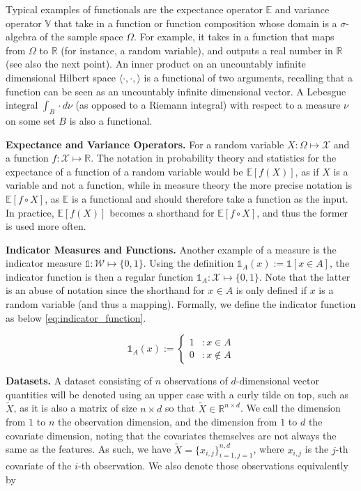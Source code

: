 \documentclass[twoside]{article} \usepackage{aistats2017}
\theoremstyle{definition}
\newcommand{\rv}[1]{{#1}}
\newcommand{\ds}[1]{\tilde{#1}}
\begin{document}
	Typical examples of functionals are the expectance operator $\mathbb{E}$ and variance operator $\mathbb{V}$ that take in a function or function composition whose domain is a $\sigma$-algebra of the sample space $\Omega$. For example, it takes in a function that maps from $\Omega$ to $\mathbb{R}$ (for instance, a random variable), and outputs a real number in $\mathbb{R}$ (see also the next point). An inner product on an uncountably infinite dimensional Hilbert space $\langle \cdot, \cdot, \rangle$ is a functional of two arguments, recalling that a function can be seen as an uncountably infinite dimensional vector. A Lebesgue integral $\int_{B} \cdot d\nu$ (as opposed to a Riemann integral) with respect to a measure $\nu$ on some set $B$ is also a functional.
	
	\textbf{Expectance and Variance Operators.} For a random variable $\rv{X} : \Omega \mapsto \mathcal{X}$ and a function $f : \mathcal{X} \mapsto \mathbb{R}$. The notation in probability theory and statistics for the expectance of a function of a random variable would be $\mathbb{E}[f(\rv{X})]$, as if $\rv{X}$ is a variable and not a function, while in measure theory the more precise notation is $\mathbb{E}[f \circ \rv{X}]$, as $\mathbb{E}$ is a functional and should therefore take a function as the input. In practice, $\mathbb{E}[f(\rv{X})]$ becomes a shorthand for $\mathbb{E}[f \circ \rv{X}]$, and thus the former is used more often.
	
	\textbf{Indicator Measures and Functions.} Another example of a measure is the indicator measure $\mathbb{1} : \mathcal{W} \mapsto \{0, 1\}$. Using the definition $\mathbb{1}_{A}(x) := \mathbb{1}[x \in A]$, the indicator function is then a regular function $\mathbb{1}_{A} : \mathcal{X} \mapsto \{0, 1\}$. Note that the latter is an abuse of notation since the shorthand for $x \in A$ is only defined if $x$ is a random variable (and thus a mapping). Formally, we define the indicator function as below \eqref{eq:indicator_function}.
	
	\begin{equation}
		\mathbb{1}_{A}(x) := \begin{cases}
			1 & : x \in A \\
			0 & : x \notin A
		\end{cases}
	\label{eq:indicator_function}
	\end{equation}
	
	\textbf{Datasets.} A dataset consisting of $n$ observations of $d$-dimensional vector quantities will be denoted using an upper case with a curly tilde on top, such as $\ds{X}$, as it is also a matrix of size $n \times d$ so that $\ds{X} \in \mathbb{R}^{n \times d}$. We call the dimension from $1$ to $n$ the observation dimension, and the dimension from $1$ to $d$ the covariate dimension, noting that the covariates themselves are not always the same as the features. As such, we have $\ds{X} = \{x_{i, j}\}_{i = 1, j = 1}^{n, d}$, where $x_{i, j}$ is the $j$-th covariate of the $i$-th observation. We also denote those observations equivalently by
\end{document}
